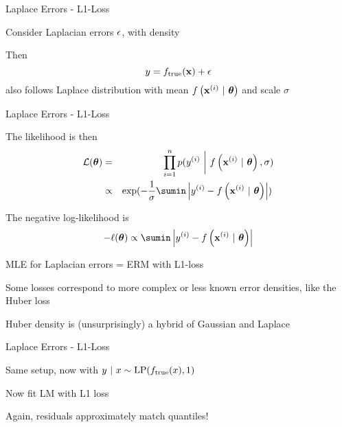 \documentclass[11pt,compress,t,notes=noshow, xcolor=table]{beamer}
\begin{document}
\begin{framei}[sep=M]{Laplace Errors - L1-Loss}

\item Consider Laplacian errors $\epsilon$, with density 

\vfill


\item Then
$$
y = f_{\text{true}}(\mathbf{x}) + \epsilon 
$$
also follows Laplace distribution with mean $f\left(\mathbf{x}^{(i)} ~|~ \bm{\theta}\right)$ and scale  $\sigma$ 

\end{framei}
\begin{framei}[sep=M]{Laplace Errors - L1-Loss}

    \item The likelihood is then 
\begin{eqnarray*}
\LL(\thetav) &=& \prod_{i=1}^n \pdf(\yi ~\bigg|~ \fxit, \sigma) \\ &\propto& \exp(-\frac{1}{\sigma}\sumin \left|\yi - \fxit\right|)\,
\end{eqnarray*}
\item The negative log-likelihood is
$$
- \loglt \propto \sumin \left|\yi - \fxit\right|
$$

\item MLE for Laplacian errors = ERM with L1-loss 

\item Some losses correspond to more complex or less known error densities, like the Huber loss 

\item Huber density is (unsurprisingly) a hybrid of Gaussian and Laplace

\end{framei}
\begin{framei}[sep=M]{Laplace Errors - L1-Loss}

\item Same setup, now with $y ~|~x \sim \text{LP}(f_{\text{true}}(x), 1)$ 
\item Now fit LM with L1 loss

\vfill



\item Again, residuals approximately match quantiles!


\end{framei}
\end{document}
